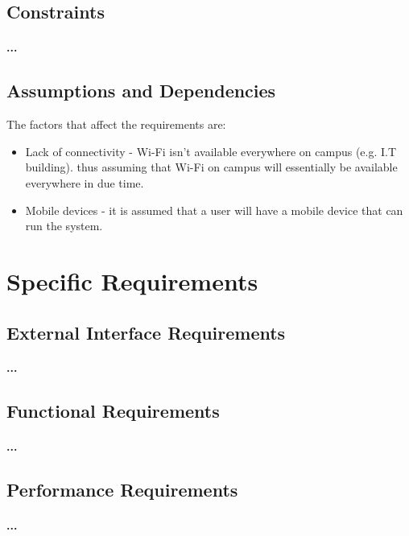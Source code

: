 \documentclass[runningheads,a4paper]{llncs}
\begin{document}
\subsection{Constraints}
\paragraph{...}

\subsection{Assumptions and Dependencies}
\let\labelitemi\labelitemii
The factors that affect the requirements are:
\begin{itemize}
	 
		\item Lack of connectivity -  Wi-Fi isn't available everywhere on campus (e.g. I.T building). thus assuming that Wi-Fi on campus will essentially be available everywhere in due time. \\
		
		\item Mobile devices - it is assumed that a user will have a mobile device that can run the system.
	 
\end{itemize}


\section{Specific Requirements}

\subsection{External Interface Requirements}
\paragraph{...}
\subsection{Functional Requirements}
\paragraph{...}
\subsection{Performance Requirements}
\paragraph{...}
\end{document}
